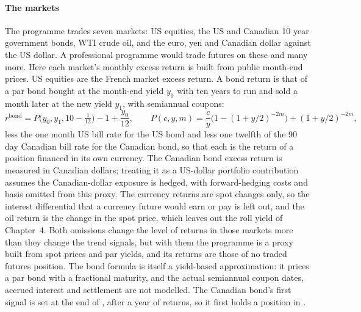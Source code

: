 \begin{chapterrefs}
\paragraph{The markets}
The programme trades seven markets: US equities, the US and Canadian 10 year government bonds, WTI
crude oil, and the euro, yen and Canadian dollar against the US dollar. A professional programme
would trade futures on these and many more. Here each market's monthly excess return is built from
public month-end prices. US equities are the French market excess return. A bond return is that of a
par bond bought at the month-end yield $y_0$ with ten years to run and sold a month later at the new
yield $y_1$, with semiannual coupons:
\begin{equation}\label{eq9:bond}
  r^{\mathrm{bond}} = P\bigl(y_0,y_1,10-\tfrac1{12}\bigr)-1+\frac{y_0}{12},\qquad
  P(c,y,m)=\frac cy\bigl(1-(1+y/2)^{-2m}\bigr)+(1+y/2)^{-2m},
\end{equation}
less the one month US bill rate for the US bond and less one twelfth of the 90 day Canadian bill rate
for the Canadian bond, so that each is the return of a position financed in its own currency. The Canadian bond excess
return is measured in Canadian dollars; treating it as a US-dollar portfolio contribution assumes the
Canadian-dollar exposure is hedged, with forward-hedging costs and basis omitted from this proxy. The
currency returns are spot changes only, so the interest differential that a currency future would
earn or pay is left out, and the oil return is the change in the spot price, which leaves out the roll
yield of Chapter~4. Both omissions change the level of returns in those markets more than they change
the trend signals, but with them the programme is a proxy built from spot prices and par yields, and
its returns are those of no traded futures position. The bond formula is itself a yield-based
approximation: it prices a par bond with a fractional maturity, and the actual semiannual coupon dates,
accrued interest and settlement are not modelled. The Canadian bond's first signal is set at the end of \tfGocFirst, after a year of returns, so it
first holds a position in \tfGocFirstPos.


\end{chapterrefs}
